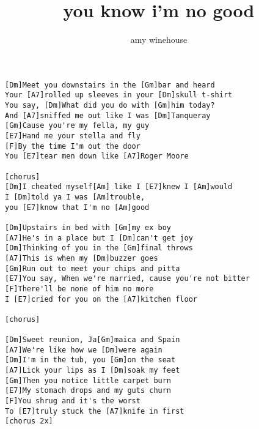 \author{amy winehouse}
\title{you know i'm no good}
\maketitle
\begin{verbatim}
[Dm]Meet you downstairs in the [Gm]bar and heard
Your [A7]rolled up sleeves in your [Dm]skull t-shirt
You say, [Dm]What did you do with [Gm]him today?
And [A7]sniffed me out like I was [Dm]Tanqueray
[Gm]Cause you're my fella, my guy
[E7]Hand me your stella and fly
[F]By the time I'm out the door
You [E7]tear men down like [A7]Roger Moore

[chorus]
[Dm]I cheated myself[Am] like I [E7]knew I [Am]would
I [Dm]told ya I was [Am]trouble,
you [E7]know that I'm no [Am]good

[Dm]Upstairs in bed with [Gm]my ex boy
[A7]He's in a place but I [Dm]can't get joy
[Dm]Thinking of you in the [Gm]final throws
[A7]This is when my [Dm]buzzer goes
[Gm]Run out to meet your chips and pitta
[E7]You say, When we're married, cause you're not bitter
[F]There'll be none of him no more
I [E7]cried for you on the [A7]kitchen floor

[chorus]

[Dm]Sweet reunion, Ja[Gm]maica and Spain
[A7]We're like how we [Dm]were again
[Dm]I'm in the tub, you [Gm]on the seat
[A7]Lick your lips as I [Dm]soak my feet
[Gm]Then you notice little carpet burn
[E7]My stomach drops and my guts churn
[F]You shrug and it's the worst
To [E7]truly stuck the [A7]knife in first
[chorus 2x]
\end{verbatim}